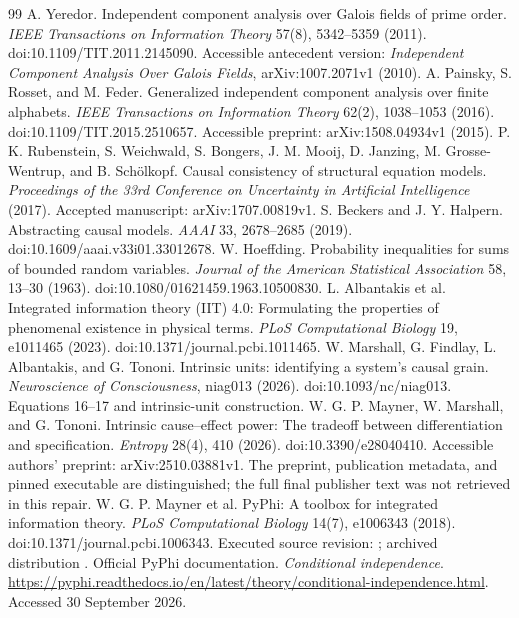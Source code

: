 \documentclass[11pt]{article}
\theoremstyle{definition}\newtheorem{definition}[theorem]{Definition}
\theoremstyle{remark}\newtheorem{remark}[theorem]{Remark}
\begin{document}
{\begin{thebibliography}{99}
 A. Yeredor. Independent component analysis over Galois fields of prime order. \emph{IEEE Transactions on Information Theory} 57(8), 5342--5359 (2011). doi:10.1109/TIT.2011.2145090. Accessible antecedent version: \emph{Independent Component Analysis Over Galois Fields}, arXiv:1007.2071v1 (2010).
 A. Painsky, S. Rosset, and M. Feder. Generalized independent component analysis over finite alphabets. \emph{IEEE Transactions on Information Theory} 62(2), 1038--1053 (2016). doi:10.1109/TIT.2015.2510657. Accessible preprint: arXiv:1508.04934v1 (2015).
 P. K. Rubenstein, S. Weichwald, S. Bongers, J. M. Mooij, D. Janzing, M. Grosse-Wentrup, and B. Sch\"olkopf. Causal consistency of structural equation models. \emph{Proceedings of the 33rd Conference on Uncertainty in Artificial Intelligence} (2017). Accepted manuscript: arXiv:1707.00819v1.
\pagebreak
{} S. Beckers and J. Y. Halpern. Abstracting causal models. \emph{AAAI} 33, 2678--2685 (2019). doi:10.1609/aaai.v33i01.33012678.
 W. Hoeffding. Probability inequalities for sums of bounded random variables. \emph{Journal of the American Statistical Association} 58, 13--30 (1963). doi:10.1080/01621459.1963.10500830.
 L. Albantakis et al. Integrated information theory (IIT) 4.0: Formulating the properties of phenomenal existence in physical terms. \emph{PLoS Computational Biology} 19, e1011465 (2023). doi:10.1371/journal.pcbi.1011465.
 W. Marshall, G. Findlay, L. Albantakis, and G. Tononi. Intrinsic units: identifying a system's causal grain. \emph{Neuroscience of Consciousness}, niag013 (2026). doi:10.1093/nc/niag013. Equations 16--17 and intrinsic-unit construction.
 W. G. P. Mayner, W. Marshall, and G. Tononi. Intrinsic cause--effect power: The tradeoff between differentiation and specification. \emph{Entropy} 28(4), 410 (2026). doi:10.3390/e28040410. Accessible authors' preprint: arXiv:2510.03881v1. The preprint, publication metadata, and pinned executable are distinguished; the full final publisher text was not retrieved in this repair.
 W. G. P. Mayner et al. PyPhi: A toolbox for integrated information theory. \emph{PLoS Computational Biology} 14(7), e1006343 (2018). doi:10.1371/journal.pcbi.1006343. Executed source revision: ; archived distribution .
 Official PyPhi documentation. \emph{Conditional independence}. \url{https://pyphi.readthedocs.io/en/latest/theory/conditional-independence.html}. Accessed 30 September 2026.

\end{thebibliography}}
\end{document}
